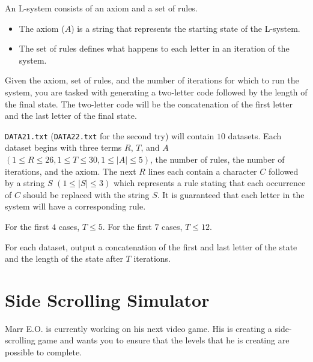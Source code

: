 \documentclass{problem-set}
\begin{document}
An L-system consists of an axiom and a set of rules.
\begin{itemize}
    \item The axiom ($A$) is a string that represents the starting state of the L-system.
    \item The set of rules defines what happens to each letter in an iteration of the system.
\end{itemize}

Given the axiom, set of rules, and the number of iterations for which to run the system, you are tasked with generating a two-letter code followed by the length of the final state. The two-letter code will be the concatenation of the first letter and the last letter of the final state.

\texttt{DATA21.txt} (\texttt{DATA22.txt} for the second try) will contain $10$ datasets. Each dataset begins with three terms $R$, $T$, and $A$ $(1 \leq R \leq 26, 1 \leq T \leq 30, 1 \leq |A| \leq 5)$, the number of rules, the number of iterations, and the axiom. The next $R$ lines each contain a character $C$ followed by a string $S$ $(1 \leq |S| \leq 3)$ which represents a rule stating that each occurrence of $C$ should be replaced with the string $S$. It is guaranteed that each letter in the system will have a corresponding rule.

For the first $4$ cases, $T \leq 5$.
For the first $7$ cases, $T \leq 12$.

\outputformat
For each dataset, output a concatenation of the first and last letter of the state and the length of the state after $T$ iterations.
\pushnewpage
{}


\newpage
\section{Side Scrolling Simulator}
Marr E.O. is currently working on his next video game. His is creating a side-scrolling game and wants you to ensure that the levels that he is creating are possible to complete.
\end{document}

